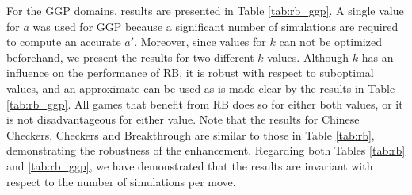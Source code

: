 \documentclass{ecai2014}
\begin{document}
For the GGP domains, results are presented in Table \ref{tab:rb_ggp}. A single value for $a$ was used for GGP because a significant number of simulations are required to compute an accurate $a'$. Moreover, since values for $k$ can not be optimized beforehand, we present the results for two different $k$ values. Although $k$ has an influence on the performance of RB, it is robust with respect to suboptimal values, and an approximate can be used as is made clear by the results in Table \ref{tab:rb_ggp}. All games that benefit from RB does so for either both values, or it is not disadvantageous for either value. Note that the results for Chinese Checkers, Checkers and Breakthrough are similar to those in Table \ref{tab:rb}, demonstrating the robustness of the enhancement. Regarding both Tables \ref{tab:rb} and \ref{tab:rb_ggp}, we have demonstrated that the results are invariant with respect to the number of simulations per move.

\begin{table}
{\caption{Qualitative Bonus using different search times, 5000 games} \label{tab:qb}}
\tabcolsep=0.15cm
\begin{center}
\end{center}
\end{table}
\end{document}
